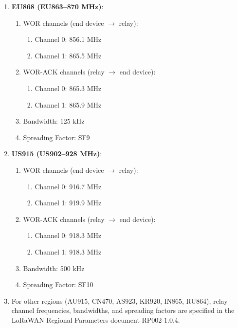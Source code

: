 \begin{enumerate}
    \item \textbf{EU868 (EU863–870 MHz)}:
          \begin{enumerate}
              \item WOR channels (end device $\rightarrow$ relay):
                    \begin{enumerate}
                        \item Channel 0: 856.1 MHz
                        \item Channel 1: 865.5 MHz
                    \end{enumerate}
              \item WOR-ACK channels (relay $\rightarrow$ end device):
                    \begin{enumerate}
                        \item Channel 0: 865.3 MHz
                        \item Channel 1: 865.9 MHz
                    \end{enumerate}
              \item Bandwidth: 125 kHz
              \item Spreading Factor: SF9
          \end{enumerate}

    \item \textbf{US915 (US902–928 MHz)}:
          \begin{enumerate}
              \item WOR channels (end device $\rightarrow$ relay):
                    \begin{enumerate}
                        \item Channel 0: 916.7 MHz
                        \item Channel 1: 919.9 MHz
                    \end{enumerate}
              \item WOR-ACK channels (relay $\rightarrow$ end device):
                    \begin{enumerate}
                        \item Channel 0: 918.3 MHz
                        \item Channel 1: 918.3 MHz
                    \end{enumerate}
              \item Bandwidth: 500 kHz
              \item Spreading Factor: SF10
          \end{enumerate}

    \item For other regions (AU915, CN470, AS923, KR920, IN865, RU864), relay channel frequencies, bandwidths, and spreading factors are specified in the LoRaWAN Regional Parameters document RP002-1.0.4.
\end{enumerate}

